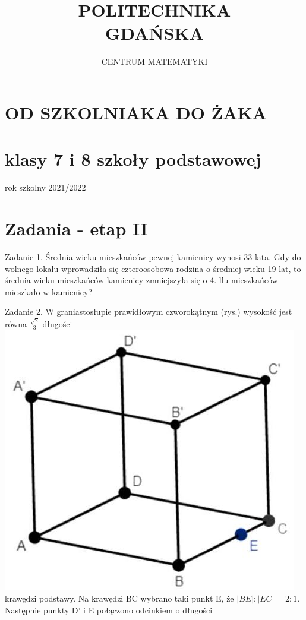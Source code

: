 \documentclass[10pt]{article}
\title{POLITECHNIKA \\
 GDAŃSKA }
\author{CENTRUM MATEMATYKI}
\date{}
\begin{document}
\maketitle


\section*{OD SZKOLNIAKA DO ŻAKA}
\section*{klasy 7 i 8 szkoły podstawowej}
rok szkolny 2021/2022

\section*{Zadania - etap II}
Zadanie 1. Średnia wieku mieszkańców pewnej kamienicy wynosi 33 lata. Gdy do wolnego lokalu wprowadziła się czteroosobowa rodzina o średniej wieku 19 lat, to średnia wieku mieszkańców kamienicy zmniejszyła się o 4. llu mieszkańców mieszkało w kamienicy?

Zadanie 2. W graniastosłupie prawidłowym czworokątnym (rys.) wysokość jest równa \(\frac{\sqrt{2}}{3}\) długości\\
\includegraphics[max width=\textwidth, center]{2024_11_21_282fcc418c438279c74dg-1}\\
krawędzi podstawy. Na krawędzi BC wybrano taki punkt E, że \(|B E|:|E C|=2: 1\). Następnie punkty D' i E połączono odcinkiem o długości
\end{document}
